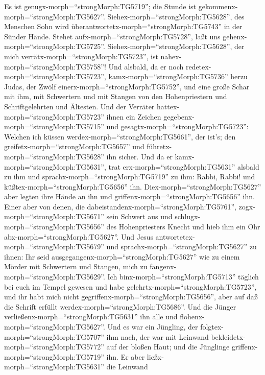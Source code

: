 Es ist genugx-morph=``strongMorph:TG5719''; die Stunde ist
gekommenx-morph=``strongMorph:TG5627''.
Siehex-morph=``strongMorph:TG5628'', des Menschen Sohn wird
überantwortetx-morph=``strongMorph:TG5743'' in der Sünder Hände.
 Stehet aufx-morph=``strongMorph:TG5728'', laßt uns
gehenx-morph=``strongMorph:TG5725''.
Siehex-morph=``strongMorph:TG5628'', der mich
verrätx-morph=``strongMorph:TG5723'', ist
nahex-morph=``strongMorph:TG5758''!  Und alsbald, da er
noch redetex-morph=``strongMorph:TG5723'',
kamx-morph=``strongMorph:TG5736'' herzu Judas, der Zwölf
einerx-morph=``strongMorph:TG5752'', und eine große Schar mit ihm, mit
Schwertern und mit Stangen von den Hohenpriestern und Schriftgelehrten
und Ältesten.  Und der Verräter
hattex-morph=``strongMorph:TG5723'' ihnen ein Zeichen
gegebenx-morph=``strongMorph:TG5715'' und
gesagtx-morph=``strongMorph:TG5723'': Welchen ich küssen
werdex-morph=``strongMorph:TG5661'', der ist's; den
greifetx-morph=``strongMorph:TG5657'' und
führetx-morph=``strongMorph:TG5628'' ihn sicher.  Und da er
kamx-morph=``strongMorph:TG5631'', trat erx-morph=``strongMorph:TG5631''
alsbald zu ihm und sprachx-morph=``strongMorph:TG5719'' zu ihm: Rabbi,
Rabbi! und küßtex-morph=``strongMorph:TG5656'' ihn. 
Diex-morph=``strongMorph:TG5627'' aber legten ihre Hände an ihn und
griffenx-morph=``strongMorph:TG5656'' ihn.  Einer aber von
denen, die dabeistandenx-morph=``strongMorph:TG5761'',
zogx-morph=``strongMorph:TG5671'' sein Schwert aus und
schlugx-morph=``strongMorph:TG5656'' des Hohenpriesters Knecht und hieb
ihm ein Ohr abx-morph=``strongMorph:TG5627''.  Und Jesus
antwortetex-morph=``strongMorph:TG5679'' und
sprachx-morph=``strongMorph:TG5627'' zu ihnen: Ihr seid
ausgegangenx-morph=``strongMorph:TG5627'' wie zu einem Mörder mit
Schwertern und Stangen, mich zu fangenx-morph=``strongMorph:TG5629''.
 Ich binx-morph=``strongMorph:TG5713'' täglich bei euch im
Tempel gewesen und habe gelehrtx-morph=``strongMorph:TG5723'', und ihr
habt mich nicht gegriffenx-morph=``strongMorph:TG5656'', aber auf daß
die Schrift erfüllt werdex-morph=``strongMorph:TG5686''. 
Und die Jünger verließenx-morph=``strongMorph:TG5631'' ihn alle und
flohenx-morph=``strongMorph:TG5627''.  Und es war ein
Jüngling, der folgtex-morph=``strongMorph:TG5707'' ihm nach, der war mit
Leinwand bekleidetx-morph=``strongMorph:TG5772'' auf der bloßen Haut;
und die Jünglinge griffenx-morph=``strongMorph:TG5719'' ihn.
 Er aber ließx-morph=``strongMorph:TG5631'' die Leinwand
